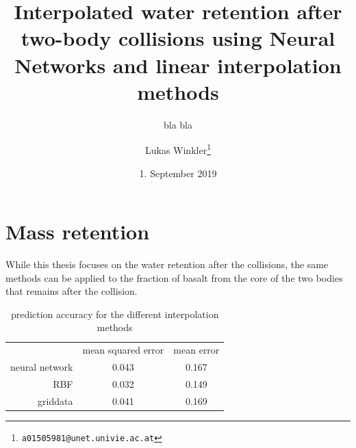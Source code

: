 
\title{Interpolated water retention after two-body collisions using Neural Networks and linear interpolation methods}
\subtitle{bla bla}
\author{Lukas Winkler\footnote{\texttt{a01505981@unet.univie.ac.at}}}
\date{1. September 2019}



	
\maketitle

\tableofcontents











\appendix

\chapter{Mass retention}

While this thesis focuses on the water retention after the collisions, the same methods can be applied to the fraction of basalt from the core of the two bodies that remains after the collision.


\begin{table}
	\centering
	\begin{tabular}{rcc}
		& {mean squared error} & {mean error} \\
		neural network &        0.043         &    0.167     \\
		RBF &        0.032         &    0.149     \\
		griddata &        0.041         &   0.169
	\end{tabular}
	\caption{prediction accuracy for the different interpolation methods}
	\label{tab:mass_comparison}
\end{table}

